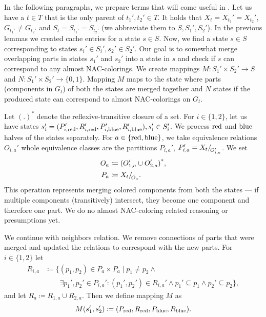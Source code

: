 \subsubsection*{\JoinNode{}}

In the following paragraphs,
we prepare terms that will come useful in .
Let us have a \JoinNode{} \( t \in T \) that is
the only parent of \( t_1', t_2' \in T \).
It holds that \( X_t = X_{t_1}' = X_{t_2}' \),
\( G_{t_1'} \ne G_{t_2'} \)
and \( S_t = S_{t_1'} = S_{t_2'} \)
(we abbreviate them to \( S, S_1', S_2' \)).
%
In the previous lemmas we created cache entries for a state \( s \in S \).
Now, we find a state \( s \in S \) corresponding to states \( s_i' \in S_i', s_2' \in S_2' \).
Our goal is to somewhat merge overlapping parts in states \( s_1' \) and \( s_2' \)
into a state in \( s \) and check if \( s \) can correspond to any almost NAC-colorings.
%
We create mappings \( M: S_1' \times S_2' \to S \) and \( N: S_1' \times S_2' \to \{0, 1\} \).
Mapping \( M \) maps to the state where parts (components in \( G_t \)) of both the states
are merged together and \( N \) states if the produced state
can correspond to almost NAC-colorings on \( G_t \).

Let \( {(.)}^* \) denote the reflexive-transitive closure of a set.
For \( i \in \{1, 2\} \), let us have states
\( s_i' = (P_{i,\text{red}}', R_{i,\text{red}}', P_{i,\text{blue}}', R_{i,\text{blue}}'), s_i' \in S_i' \).
%
We process \( \text{red} \) and \( \text{blue} \) halves of the states separately.
For \( a \in \{\text{red}, \text{blue}\} \),
we take equivalence relations \( O_{i, a}' \)
whole equivalence classes are the partitions \( P_{i, a}' \),
\( P_{i, a}' = X_t{/\!}_{O_{i, a}'}\).
We set
%
\begin{align*}
	O_a & \coloneqq {(O_{1, a}' \cup O_{2, a}')}^*, \\
	P_a & \coloneqq X_t{/\!}_{O_a}.
\end{align*}
%
This operation represents merging colored components from both the states
--- if multiple components (transitively) intersect, they become one
component and therefore one part.
We do no almost NAC-coloring related reasoning or presumptions yet.

We continue with neighbors relation. We remove connections of parts
that were merged and updated the relations to correspond with the new parts.
For \( i \in \{1, 2\} \) let
%
\begin{align*}
	R_{i,a} & \coloneqq \{(p_1, p_2) \in P_a \times P_a \mid p_{1} \ne p_{2} \land                                                    \\
	        & \qquad \exists p_1', p_2' \in P_{i,a}' : (p_1', p_2') \in R_{i,a}' \land p_1' \subseteq p_1 \land p_2' \subseteq p_2\},
\end{align*}
%
and let \( R_a \coloneqq R_{1,a} \cup R_{2,a} \).
Then we define mapping \( M \) as
\[ M(s_1', s_2') \coloneqq (P_{\text{red}}, R_{\text{red}}, P_{\text{blue}}, R_{\text{blue}}). \]

